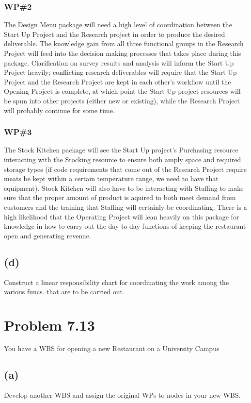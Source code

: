 \documentclass{article}
\begin{document}
	\subsubsection*{WP\#2}
	The Design Menu package will need a high level of coordination between the Start Up Project and the Research project in order to produce the desired deliverable. The knowledge gain from all three functional groups in the 		Research Project will feed into the decision making processes that takes place during this package. Clarification on survey results and analysis will inform the Start Up Project heavily; conflicting research deliverables will require 		that the Start Up Project and the Research Project are kept in each other's workflow until the Opening Project is complete, at which point the Start Up project resources will be spun into other projects (either new or existing), while 	the Research Project will probably 	continue for some time.
	\subsubsection*{WP\#3}
	The Stock Kitchen package will see the Start Up project's Purchasing resource interacting with the Stocking resource to ensure both amply space and required storage types (if code requirements that come out of the Research 		Project require meats be kept within a certain temperature range, we need to have that equipment). Stock Kitchen will also have to be interacting with Staffing to make sure that the proper amount of product is aquired to both meet 	demand from customers and the training that Staffing will certainly be coordinating. 
	\newline
	There is a high likelihood that the Operating Project will lean heavily on this package for knowledge in how to carry out the day-to-day functions of keeping the restaurant open and generating revenue.
		
	\subsection*{\quad(d)}
	Construct a linear responsibility chart for coordinating the work among the various funcs. that are to be carried out.
	
	\section*{Problem 7.13}
	You have a WBS for opening a new Restaurant on a University Campus
	\subsection*{\quad(a)}
	Develop another WBS and assign the original WPs to nodes in your new WBS.
\end{document}
